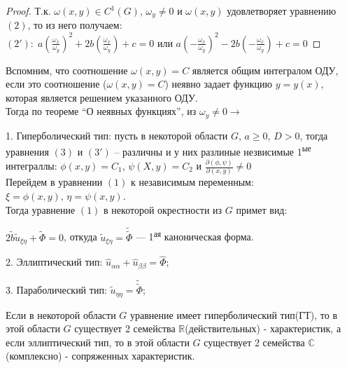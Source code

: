 \begin{proof}
	Т.к. $\omega(x,y)\in C^1(G),\,\omega_y\ne 0$ и $\omega(x,y)$ удовлетворяет уравнению $(2)$, то из него получаем:\\
	$\displaystyle(2'):\; a\left(\frac{\omega_x}{\omega_y}\right)^2+2b\left(\frac{\omega_x}{\omega_y}\right)+c=0$ или
	$\displaystyle a\left(-\frac{\omega_x}{\omega_y}\right)^2-2b\left(-\frac{\omega_x}{\omega_y}\right)+c=0$
\end{proof}
Вспомним, что соотношение $\omega(x,y)=C$ является общим интегралом ОДУ, если это соотношение ($\omega(x,y)=C$) неявно задает функцию $y=y(x)$, которая
является решением указанного ОДУ.\\
Тогда по теореме ``О неявных функциях'', из $\omega_y\ne0\rightarrow$

\hspace*{1em}  1. Гиперболический тип: пусть в некоторой области $G$, $a\ge0$, $D>0$, тогда уравнения $(3)$ и $(3')$ -- различны и у них разлиные незвисимые 1\textsuperscript{ые} интеграллы: $\phi(x,y)=C_1$, $\psi(X,y)=C_2$ и $\displaystyle \frac{\partial(\phi,\psi)}{\partial(x,y)}\ne 0$\\%
Перейдем в уравнении $(1)$ к независимым переменным:
$\xi=\phi(x,y),\,\eta=\psi(x,y)$.\\
Тогда уравнение $(1)$ в некоторой окрестности из $G$ примет вид:

\hspace*{2em} $2\widetilde b \widetilde u_{\xi\eta}+\widetilde \Phi=0$, откуда $\widetilde u_{\xi\eta}=\widetilde{\widetilde \Phi}$ --- 1\textsuperscript{ая} каноническая форма.

\hspace*{1em}  2. Эллиптический тип: $\displaystyle \hat{u}_{\alpha\alpha}+\hat{u}_{\beta\beta}=\hat\Phi $;

\hspace*{1em}  3. Параболический тип: $\displaystyle \widetilde{u}_{\eta\eta}=\widetilde{\widetilde{\Phi}} $;
\begin{note}
	Если в некоторой области $G$ уравнение имеет гиперболический тип(ГТ), то в этой области $G$ существует 2 семейства $\mathbb R$(действительных) - характеристик, а если эллиптический тип, то в этой области $G$ существует 2 семейства $\mathbb C$(комплексно) - сопряженных характеристик.
\end{note}

